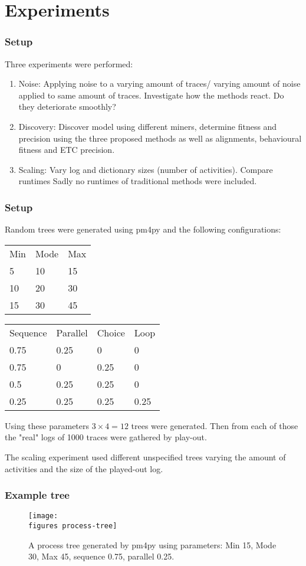 \documentclass{beamer}
\newcommand{\figures}{../figures/}
\begin{document}
	\section{Experiments}
	\begin{frame}
		\frametitle{Setup}
		Three experiments were performed:
		\begin{enumerate}
			\item Noise: Applying noise to a varying amount of traces/ varying amount of noise applied to same amount of traces. Investigate how the methods react. Do they deteriorate smoothly?
			\item Discovery: Discover model using different miners, determine fitness and precision using the three proposed methods as well as alignments, behavioural fitness and ETC precision.
			\item Scaling: Vary log and dictionary sizes (number of activities). Compare runtimes \alert{Sadly no runtimes of traditional methods were included.}
		\end{enumerate}
	\end{frame}
	\begin{frame}
		\frametitle{Setup}
		Random trees were generated using pm4py and the following configurations:
		
		\begin{tabular}{lll}
			Min & Mode & Max \\
			5 & 10 & 15 \\
			10 & 20 & 30 \\
			15 & 30 & 45 \\
		\end{tabular}
		\begin{tabular}{llll}
			Sequence & Parallel & Choice & Loop \\
			0.75 & 0.25 & 0 & 0 \\
			0.75 & 0 & 0.25 & 0 \\
			0.5 & 0.25 & 0.25 & 0 \\
			0.25 & 0.25 & 0.25 & 0.25 \\
		\end{tabular}
		
		Using these parameters $3\times4=12$ trees were generated.
		Then from each of those the "real" logs of 1000 traces were gathered by play-out.
		
		The scaling experiment used different unspecified trees varying the amount of activities and the size of the played-out log.
	\end{frame}
	\begin{frame}
		\frametitle{Example tree}
		\begin{figure}
			\texttt{[image: \\figures process-tree]}
			\caption{A process tree generated by pm4py using parameters: Min 15, Mode 30, Max 45, sequence 0.75, parallel 0.25. }
			\label{fig:process-tree}
		\end{figure}
	\end{frame}
	
\end{document}
